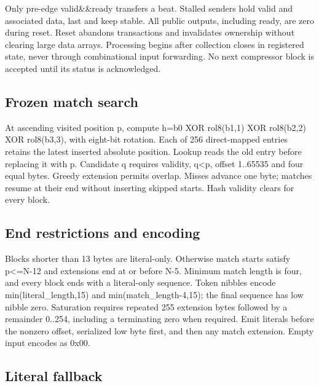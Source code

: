 \documentclass[11pt,a4paper]{article}
\begin{document}
Only pre-edge valid\&\&ready transfers a beat. Stalled senders hold valid and associated data,\allowbreak{} last and keep stable. All public outputs,\allowbreak{} including ready,\allowbreak{} are zero during reset. Reset abandons transactions and invalidates ownership without clearing large data arrays. Processing begins after collection closes in registered state,\allowbreak{} never through combinational input forwarding. No next compressor block is accepted until its status is acknowledged.

\subsection{Frozen match search}

At ascending visited position p,\allowbreak{} compute h=\allowbreak{}b0 XOR rol8(\allowbreak{}b1,\allowbreak{}1)\allowbreak{} XOR rol8(\allowbreak{}b2,\allowbreak{}2)\allowbreak{} XOR rol8(\allowbreak{}b3,\allowbreak{}3)\allowbreak{},\allowbreak{} with eight-bit rotation. Each of 256 direct-mapped entries retains the latest inserted absolute position. Lookup reads the old entry before replacing it with p. Candidate q requires validity,\allowbreak{} q<p,\allowbreak{} offset 1..65535 and four equal bytes. Greedy extension permits overlap. Misses advance one byte; matches resume at their end without inserting skipped starts. Hash validity clears for every block.

\subsection{End restrictions and encoding}

Blocks shorter than 13 bytes are literal-only. Otherwise match starts satisfy p<=\allowbreak{}N-12 and extensions end at or before N-5. Minimum match length is four,\allowbreak{} and every block ends with a literal-only sequence. Token nibbles encode min(\allowbreak{}literal\_\allowbreak{}length,\allowbreak{}15)\allowbreak{} and min(\allowbreak{}match\_\allowbreak{}length-4,\allowbreak{}15)\allowbreak{}; the final sequence has low nibble zero. Saturation requires repeated 255 extension bytes followed by a remainder 0..254,\allowbreak{} including a terminating zero when required. Emit literals before the nonzero offset,\allowbreak{} serialized low byte first,\allowbreak{} and then any match extension. Empty input encodes as 0x00.

\subsection{Literal fallback}
\end{document}
